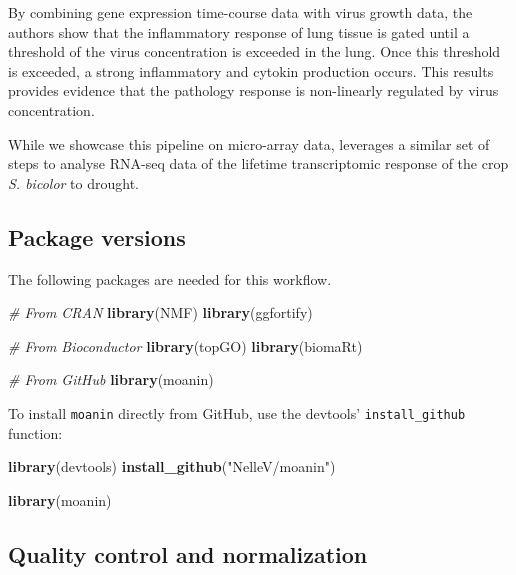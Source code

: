 \documentclass[9pt,a4paper,]{extarticle}
\newenvironment{Shaded}{\begin{snugshade}}{\end{snugshade}}
\newcommand{\CommentTok}[1]{\textcolor[rgb]{0.56,0.35,0.01}{\textit{#1}}}
\newcommand{\KeywordTok}[1]{\textcolor[rgb]{0.13,0.29,0.53}{\textbf{#1}}}
\newcommand{\NormalTok}[1]{#1}
\newcommand{\StringTok}[1]{\textcolor[rgb]{0.31,0.60,0.02}{#1}}
\begin{document}
By combining gene expression time-course data with virus growth data, the
authors show that the inflammatory response of lung tissue is gated until a
threshold of the virus concentration is exceeded in the lung. Once this
threshold is exceeded, a strong inflammatory and cytokin production occurs.
This results provides evidence that the pathology response is non-linearly
regulated by virus concentration.

While we showcase this pipeline on micro-array data, \citep{varoquaux:lifecycle}
leverages a similar set of steps to analyse RNA-seq data of the lifetime
transcriptomic response of the crop \emph{S. bicolor} to drought.

\hypertarget{package-versions}{%
\subsection{Package versions}\label{package-versions}}

The following packages are needed for this workflow.

\begin{Shaded}
\begin{Highlighting}[]
\CommentTok{# From CRAN}
\KeywordTok{library}\NormalTok{(NMF)}
\KeywordTok{library}\NormalTok{(ggfortify)}

\CommentTok{# From Bioconductor}
\KeywordTok{library}\NormalTok{(topGO)}
\KeywordTok{library}\NormalTok{(biomaRt)}

\CommentTok{# From GitHub}
\KeywordTok{library}\NormalTok{(moanin)}
\end{Highlighting}
\end{Shaded}

To install \texttt{moanin} directly from GitHub, use the devtools' \texttt{install\_github}
function:

\begin{Shaded}
\begin{Highlighting}[]
\KeywordTok{library}\NormalTok{(devtools)}
\KeywordTok{install_github}\NormalTok{(}\StringTok{"NelleV/moanin"}\NormalTok{)}

\KeywordTok{library}\NormalTok{(moanin)}
\end{Highlighting}
\end{Shaded}

\hypertarget{quality-control-and-normalization}{%
\subsection{Quality control and normalization}\label{quality-control-and-normalization}}
\end{document}
